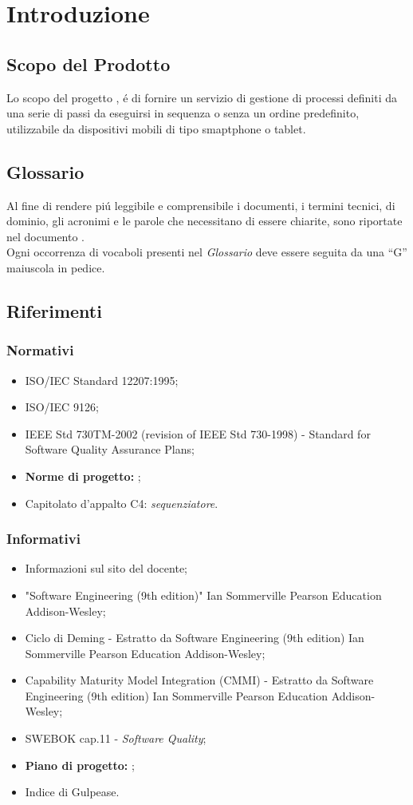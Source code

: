 \section{Introduzione}
\subsection{Scopo del Prodotto}
Lo scopo del progetto \progetto{}, \'e di fornire un servizio di gestione di processi definiti da una serie di passi da eseguirsi in sequenza o senza un ordine predefinito, utilizzabile da dispositivi mobili di tipo smaptphone o tablet.
\subsection{Glossario}
Al fine di rendere pi\'u leggibile e comprensibile i documenti, i termini tecnici, di dominio, gli acronimi e le parole che necessitano di essere chiarite, sono riportate nel documento \Glossario{}.\\
Ogni occorrenza di vocaboli presenti nel \textit{Glossario} deve essere seguita da una ``G'' maiuscola in pedice.
\subsection{Riferimenti}
\subsubsection{Normativi}
\begin{itemize}
\item ISO/IEC Standard 12207:1995;
\item ISO/IEC 9126;
\item IEEE Std 730TM-2002 (revision of IEEE Std 730-1998) - Standard for Software Quality Assurance Plans;
\item \textbf{Norme di progetto:} \infoNDP ;
\item Capitolato d'appalto C4: \textit{sequenziatore}.
\end{itemize}
\subsubsection{Informativi}
\begin{itemize}
\item Informazioni sul sito del docente;
\item "Software Engineering (9th edition)" Ian Sommerville Pearson Education Addison-Wesley;
\item Ciclo di Deming - Estratto da Software Engineering (9th edition)
Ian Sommerville Pearson Education Addison-Wesley;
\item Capability Maturity Model Integration (CMMI) - Estratto da Software Engineering (9th edition)
Ian Sommerville Pearson Education Addison-Wesley;
\item SWEBOK cap.11 - \textit{Software Quality};
\item \textbf{Piano di progetto:} \infoPDP ;
\item Indice di Gulpease.
\end{itemize}
